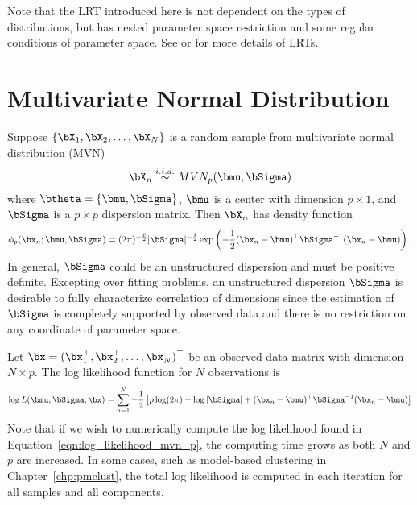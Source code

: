 Note that the LRT introduced here is not dependent on the types of
distributions, but has nested parameter space restriction and some
regular conditions of parameter space.
See \citet{Casella2001} or \citet{Ferguson1996} for more details of LRTs.




\section{Multivariate Normal Distribution}
\label{sec:mvn}

Suppose $\{\bX_1,\bX_2,\ldots,\bX_N\}$ is a random sample from
multivariate normal distribution
(MVN)
\begin{equation}
\bX_n \stackrel{i.i.d.}{\sim} MVN_p(\bmu, \bSigma)
\label{eqn:mvn_p}
\end{equation}
where $\btheta = \{\bmu, \bSigma\}$, $\bmu$ is a center with
dimension $p\times 1$, and $\bSigma$ is a $p\times p$ dispersion
matrix.
Then $\bX_n$ has density function
\begin{equation*}
\displaystyle
\phi_p(\bx_n; \bmu, \bSigma) =
(2\pi)^{-\frac{p}{2}} |\bSigma|^{-\frac{1}{2}}
\exp\left(-\frac{1}{2} (\bx_n - \bmu)^\top \bSigma^{-1} (\bx_n - \bmu)\right).
\end{equation*}
In general, $\bSigma$ could be an unstructured dispersion and must be positive
definite. Excepting over fitting problems,
an unstructured dispersion $\bSigma$ is desirable to fully
characterize correlation of dimensions since the estimation of
$\bSigma$ is completely supported by observed data and there is no
restriction on any coordinate of parameter space.

Let $\bx = (\bx_1^\top, \bx_2^\top, \ldots, \bx_N^\top)^\top$
be an observed data matrix with dimension $N\times p$.
The log likelihood function for $N$ observations is
\begin{equation}
\displaystyle
\log L(\bmu, \bSigma; \bx) = \sum_{n = 1}^N
-\frac{1}{2}
\left[
p\log(2\pi) + \log|\bSigma| + (\bx_n - \bmu)^\top \bSigma^{-1} (\bx_n - \bmu)
\right]
\label{eqn:log_likelihood_mvn_p}
\end{equation}
Note that if we wish to numerically compute the log likelihood found in 
Equation~\ref{eqn:log_likelihood_mvn_p}, the computing time grows as both $N$ 
and $p$ are increased.  In some cases, such as model-based clustering
in Chapter~\ref{chp:pmclust}, the total log likelihood is computed in each 
iteration for all samples and all components.

